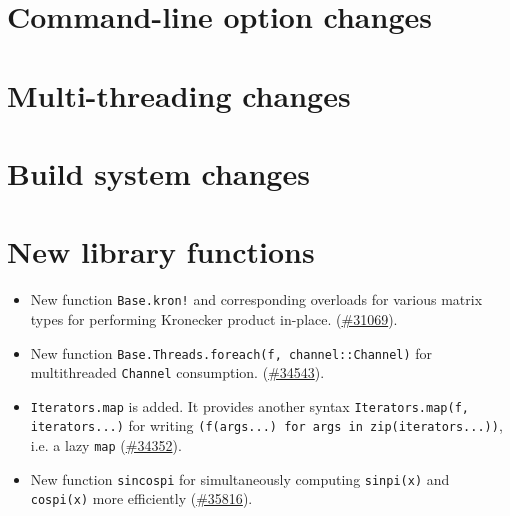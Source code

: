 \hypertarget{5697668691293835936}{}


\chapter{Command-line option changes}



\hypertarget{14570500277119829183}{}


\chapter{Multi-threading changes}



\hypertarget{2615165321246055486}{}


\chapter{Build system changes}



\hypertarget{11814740728129372900}{}


\chapter{New library functions}



\begin{itemize}
\item New function \texttt{Base.kron!} and corresponding overloads for various matrix types for performing Kronecker product in-place. (\href{https://github.com/JuliaLang/julia/issues/31069}{\#31069}).


\item New function \texttt{Base.Threads.foreach(f, channel::Channel)} for multithreaded \texttt{Channel} consumption. (\href{https://github.com/JuliaLang/julia/issues/34543}{\#34543}).


\item \texttt{Iterators.map} is added. It provides another syntax \texttt{Iterators.map(f, iterators...)} for writing \texttt{(f(args...) for args in zip(iterators...))}, i.e. a lazy \texttt{map} (\href{https://github.com/JuliaLang/julia/issues/34352}{\#34352}).


\item New function \texttt{sincospi} for simultaneously computing \texttt{sinpi(x)} and \texttt{cospi(x)} more efficiently (\href{https://github.com/JuliaLang/julia/issues/35816}{\#35816}).

\end{itemize}


